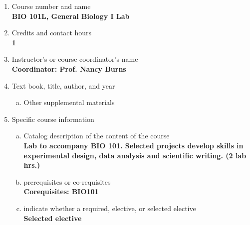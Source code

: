 \label{BIO101L}  %
\begin{enumerate}[1.]
\item Course number and name\\
  {\bfseries
    BIO 101L, General Biology I Lab
  }
  
\item Credits and contact hours\\
  {\bfseries
    1    
  }

\item Instructor's or course coordinator's name\\
  {\bfseries
    Coordinator: Prof. Nancy Burns
  }

\item Text book, title, author, and year\\
  {\bfseries
    
  }
\begin{enumerate}[a.]
\item Other supplemental materials\\
  {\bfseries
    
  }
\end{enumerate}

\item Specific course information
\begin{enumerate}[a.]  
\item Catalog description of the content of the course\\
  {\bfseries
    Lab to accompany BIO 101. Selected projects develop skills in experimental design, data analysis and scientific writing. (2 lab hrs.)    
  }

\item prerequisites or co-requisites\\
  {\bfseries
    Corequisites: BIO101
  }

\item indicate whether a required, elective, or selected elective\\ %
  {\bfseries
    Selected elective
  }


\end{enumerate}
\end{enumerate}
